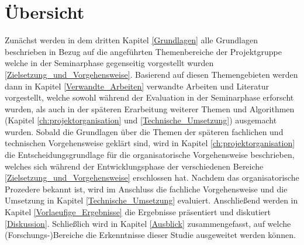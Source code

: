 \section{Übersicht}

Zunächst werden in dem dritten Kapitel \ref{Grundlagen} alle Grundlagen beschrieben in Bezug auf die angeführten Themenbereiche der Projektgruppe welche in der Seminarphase gegenseitig vorgestellt wurden \ref{Zielsetzung_und_Vorgehensweise}. Basierend auf diesen Themengebieten werden dann in Kapitel \ref{Verwandte_Arbeiten} verwandte Arbeiten und Literatur vorgestellt, welche sowohl während der Evaluation in der Seminarphase erforscht wurden, als auch in der späteren Erarbeitung weiterer Themen und Algorithmen (Kapitel \ref{ch:projektorganisation} und \ref{Technische_Umsetzung}) ausgemacht wurden. Sobald die Grundlagen über die Themen der späteren fachlichen und technischen Vorgehensweise geklärt sind, wird in Kapitel \ref{ch:projektorganisation} die Entscheidungsgrundlage für die organisatorische Vorgehensweise beschrieben, welches sich während der Entwicklungsphase der verschiedenen Bereiche \ref{Zielsetzung_und_Vorgehensweise} erschlossen hat. Nachdem das organisatorische Prozedere bekannt ist, wird im Anschluss die fachliche Vorgehensweise und die Umsetzung in Kapitel \ref{Technische_Umsetzung} evaluiert. Anschließend werden in Kapitel \ref{Vorlaeufige_Ergebnisse} die Ergebnisse präsentiert und diskutiert \ref{Diskussion}. Schließlich wird in Kapitel \ref{Ausblick} zusammengefasst, auf welche (Forschungs-)Bereiche die Erkenntnisse dieser Studie ausgeweitet werden können.